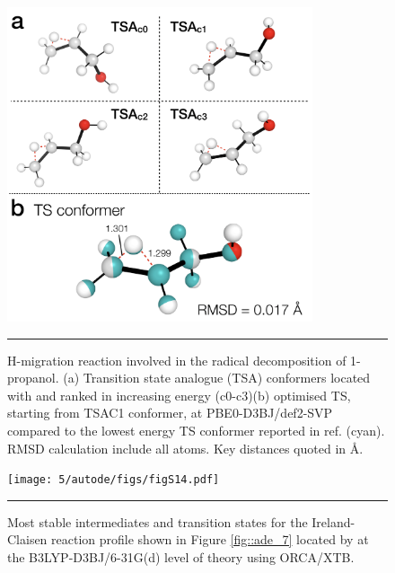 \documentclass[../../main.tex]{subfiles}
\begin{document}
\begin{figure}[h!]
	\vspace{0.4cm}
	\centering
	\includegraphics[width=9cm]{5/autode/figs/figS13}
	\vspace{0.4cm}
	\hrule
	\caption{H-migration reaction involved in the radical decomposition of 1-propanol. (a) Transition state analogue (TSA) conformers located with \ade and ranked in increasing energy (c0-c3)(b) optimised TS, starting from TSAC1 conformer, at PBE0-D3BJ/def2-SVP compared to the lowest energy TS conformer reported in ref. \cite{Ferro-Costas2018} (cyan). RMSD calculation include all atoms. Key distances quoted in \AA.}
	\label{fig::ade_si_13}
\end{figure}



\begin{figure}[h!]
	\vspace{0.4cm}
	\centering
	\texttt{[image: 5/autode/figs/figS14.pdf]}
	\vspace{0.4cm}
	\hrule
	\caption{Most stable intermediates and transition states for the Ireland-Claisen reaction profile shown in Figure \ref{fig::ade_7} located by \ade at the B3LYP-D3BJ/6-31G(d) level of theory using ORCA/XTB. }
	\label{fig::ade_si_14}
\end{figure}
\end{document}
